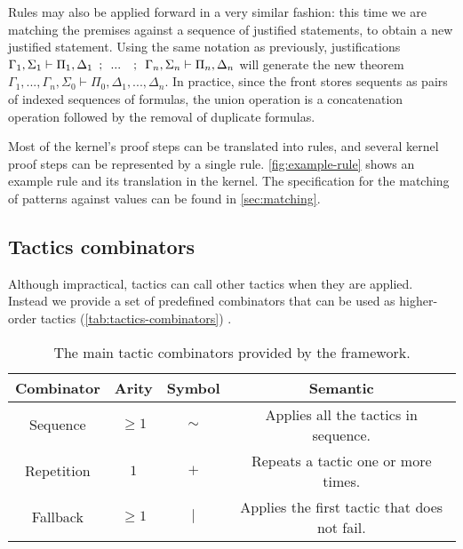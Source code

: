 Rules may also be applied forward in a very similar fashion: this time we are matching the premises against a sequence of justified statements, to obtain a new justified statement. Using the same notation as previously, justifications $\Gamma_1, \Sigma_1 \vdash \Pi_1, \Delta_1 \hspace{0.5em} ; \hspace{0.5em} ... \hspace{0.5em} \hspace{0.5em} ; \hspace{0.5em} \Gamma_n, \Sigma_n \vdash \Pi_n, \Delta_n$ will generate the new theorem $\Gamma_1, ..., \Gamma_n, \Sigma_0 \vdash \Pi_0, \Delta_1, ..., \Delta_n$. In practice, since the front stores sequents as pairs of indexed sequences of formulas, the union operation is a concatenation operation followed by the removal of duplicate formulas.

Most of the kernel's proof steps can be translated into rules, and several kernel proof steps can be represented by a single rule. \autoref{fig:example-rule} shows an example rule and its translation in the kernel. The specification for the matching of patterns against values can be found in \autoref{sec:matching}.

\subsection{Tactics combinators}

Although impractical, tactics can call other tactics when they are applied. Instead we provide a set of predefined combinators that can be used as higher-order tactics (\autoref{tab:tactics-combinators}) \cite{Milner1984}.

\begin{table}[hbt!]
  \centering
  \begin{tabular}{||c c c c||}
  \hline
  \textbf{Combinator} & \textbf{Arity} & \textbf{Symbol} & \textbf{Semantic} \\
  \hline\hline
  Sequence & $\geq 1$ & $\sim$ & Applies all the tactics in sequence. \\ \hline
  Repetition & $1$ & $+$ & Repeats a tactic one or more times. \\ \hline
  Fallback & $\geq 1$ & $|$ & Applies the first tactic that does not fail. \\ \hline
  \end{tabular}
  \caption[Available combinators]{The main tactic combinators provided by the framework.}
  \label{tab:tactics-combinators}
\end{table}


